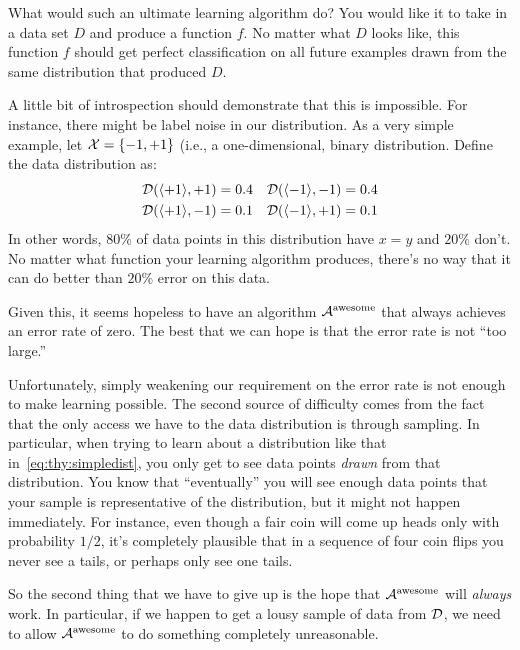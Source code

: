 What would such an ultimate learning algorithm do?  You would like it
to take in a data set $D$ and produce a function $f$.  No matter what
$D$ looks like, this function $f$ should get perfect classification on
all future examples drawn from the same distribution that produced
$D$.

A little bit of introspection should demonstrate that this is
impossible.  For instance, there might be label noise in our
distribution.  As a very simple example, let $\mathcal{X} = \{-1,+1\}$ (i.e.,
a one-dimensional, binary distribution.  Define the data distribution
as:
\begin{align}  \label{eq:thy:simpledist}
\mathcal{D}( \langle +1 \rangle , +1 ) &= 0.4 &
\mathcal{D}( \langle -1 \rangle , -1 ) &= 0.4 \\
\mathcal{D}( \langle +1 \rangle , -1 ) &= 0.1 &
\mathcal{D}( \langle -1 \rangle , +1 ) &= 0.1
\end{align}
In other words, $80\%$ of data points in this distribution have $x = y$
and $20\%$ don't.  No matter what function your learning algorithm
produces, there's no way that it can do better than $20\%$ error on
this data.


Given this, it seems hopeless to have an algorithm
$\mathcal{A}^{\text{awesome}}$ that always achieves an error rate of zero.
The best that we can hope is that the error rate is not ``too large.''

Unfortunately, simply weakening our requirement on the error rate is
not enough to make learning possible.  The second source of difficulty
comes from the fact that the only access we have to the data
distribution is through sampling.  In particular, when trying to learn
about a distribution like that in~\ref{eq:thy:simpledist}, you only get
to see data points \emph{drawn} from that distribution.  You know that
``eventually'' you will see enough data points that your sample is
representative of the distribution, but it might not happen
immediately.  For instance, even though a fair coin will come up heads
only with probability $1/2$, it's completely plausible that in a
sequence of four coin flips you never see a tails, or perhaps only see
one tails.

So the second thing that we have to give up is the hope that
$\mathcal{A}^{\text{awesome}}$ will \emph{always} work.  In particular, if we
happen to get a lousy sample of data from $\mathcal{D}$, we need to allow
$\mathcal{A}^{\text{awesome}}$ to do something completely unreasonable.

